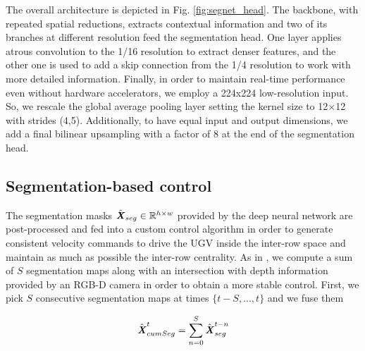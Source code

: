 \documentclass[journal]{IEEEtran}
\begin{document}
The overall architecture is depicted in Fig. \ref{fig:segnet_head}. The backbone, with repeated spatial reductions, extracts contextual information and two of its branches at different resolution feed the segmentation head. One layer applies atrous convolution
to the 1/16 resolution to extract denser features, and the
other one is used to add a skip connection from the 1/4
resolution to work with more detailed information. Finally, in order to maintain real-time performance even without hardware accelerators, we employ a 224x224 low-resolution input. So, we rescale the global
average pooling layer setting the kernel size to 12×12 with
strides (4,5). Additionally, to have equal input and output
dimensions, we add a final bilinear upsampling with a factor of 8 at the end of the segmentation head.
\vspace{-5pt}
\subsection{Segmentation-based control}\label{seg_based_section}
The segmentation masks $\hat{\textbf{\textit{X}}}_{seg} \in  \mathbb{R}^{h\times w}$ provided by the deep neural network are post-processed and fed into a custom control algorithm in order to generate consistent velocity commands to drive the UGV inside the inter-row space and maintain as much as possible the inter-row centrality. As in \cite{aghi2021deep}, we compute a sum of $S$ segmentation maps along with an intersection with depth information provided by an RGB-D camera in order to obtain a more stable control. First, we pick $S$ consecutive segmentation maps at times $\{t-S,...,t\}$ and we fuse them 

\begin{equation}
    \hat{\textbf{\textit{X}}}_{cumSeg}^{t} = \sum_{n=0}^{S} \hat{\textbf{\textit{X}}}_{seg}^{t-n}
    \label{sum_seg_maps}
\end{equation}
\end{document}

